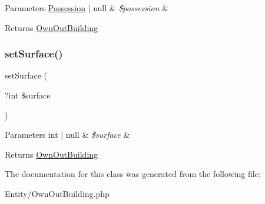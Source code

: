 \begin{DoxyParams}[1]{Parameters}
\mbox{\hyperlink{class_app_1_1_entity_1_1_possession}{Possession}} | null & {\em \$possession} & \\
\hline
\end{DoxyParams}
\begin{DoxyReturn}{Returns}
\mbox{\hyperlink{class_app_1_1_entity_1_1_own_out_building}{Own\+Out\+Building}} 
\end{DoxyReturn}
\mbox{\label{class_app_1_1_entity_1_1_own_out_building_a0cc7d745f571f40e9bc6a30bfece6159}} 
\subsubsection{\texorpdfstring{setSurface()}{setSurface()}}
{\footnotesize\ttfamily set\+Surface (\begin{DoxyParamCaption}\item[{?int}]{\$surface }\end{DoxyParamCaption})}


\begin{DoxyParams}[1]{Parameters}
int | null & {\em \$surface} & \\
\hline
\end{DoxyParams}
\begin{DoxyReturn}{Returns}
\mbox{\hyperlink{class_app_1_1_entity_1_1_own_out_building}{Own\+Out\+Building}} 
\end{DoxyReturn}


The documentation for this class was generated from the following file\+:\begin{DoxyCompactItemize}
\item 
Entity/Own\+Out\+Building.\+php\end{DoxyCompactItemize}
